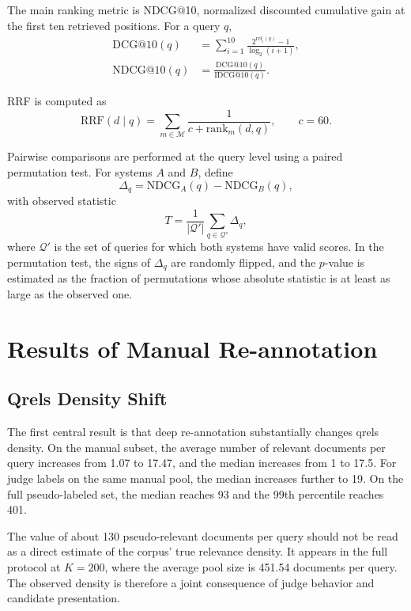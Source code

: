 \documentclass[runningheads,a4paper]{llncs}
\begin{document}
The main ranking metric is NDCG@10, normalized discounted cumulative gain at the first ten retrieved positions. For a query $q$,
\begin{align}
\label{eq:dcg}
\mathrm{DCG}@10(q) &= \sum_{i=1}^{10} \frac{2^{\mathrm{rel}_i(q)} - 1}{\log_2(i + 1)}, \\
\label{eq:ndcg}
\mathrm{NDCG}@10(q) &= \frac{\mathrm{DCG}@10(q)}{\mathrm{IDCG}@10(q)}.
\end{align}

RRF is computed as
\begin{equation}
\label{eq:rrf}
\mathrm{RRF}(d \mid q) = \sum_{m \in \mathcal{M}} \frac{1}{c + \mathrm{rank}_m(d,q)}, \qquad c = 60.
\end{equation}

Pairwise comparisons are performed at the query level using a paired permutation test. For systems $A$ and $B$, define
\begin{equation}
\label{eq:delta}
\Delta_q = \mathrm{NDCG}_A(q) - \mathrm{NDCG}_B(q),
\end{equation}
with observed statistic
\begin{equation}
\label{eq:perm}
T = \frac{1}{|\mathcal{Q}'|} \sum_{q \in \mathcal{Q}'} \Delta_q,
\end{equation}
where $\mathcal{Q}'$ is the set of queries for which both systems have valid scores. In the permutation test, the signs of $\Delta_q$ are randomly flipped, and the $p$-value is estimated as the fraction of permutations whose absolute statistic is at least as large as the observed one.

\section{Results of Manual Re-annotation}

\subsection{Qrels Density Shift}

The first central result is that deep re-annotation substantially changes qrels density. On the manual subset, the average number of relevant documents per query increases from 1.07 to 17.47, and the median increases from 1 to 17.5. For judge labels on the same manual pool, the median increases further to 19. On the full pseudo-labeled set, the median reaches 93 and the 99th percentile reaches 401.

The value of about 130 pseudo-relevant documents per query should not be read as a direct estimate of the corpus' true relevance density. It appears in the full protocol at $K=200$, where the average pool size is 451.54 documents per query. The observed density is therefore a joint consequence of judge behavior and candidate presentation.
\end{document}
